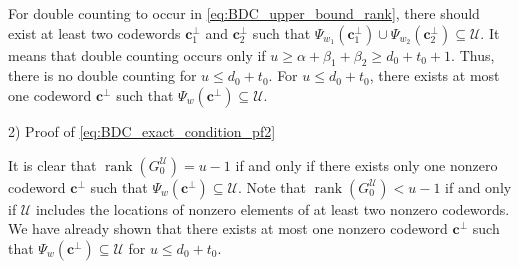 \documentclass[10pt,twocolumn,twoside,submit]{JCNtran}
\DeclareMathOperator{\rank}{rank}
\begin{document}
	For double counting to occur in \eqref{eq:BDC_upper_bound_rank}, there should exist at least two codewords ${\mathbf{c}}_1^{\perp}$ and ${\mathbf{c}}_2^{\perp}$ such that $\Psi_{w_1}\left({\mathbf{c}}_1^{\perp}\right) \cup \Psi_{w_2}\left({\mathbf{c}}_2^{\perp}\right) \subseteq\mathcal{U}$. It means that double counting occurs only if $u \ge \alpha + \beta_1 + \beta_2 \ge d_0 + t_0 + 1$. Thus, there is no double counting for $u \le d_0 + t_0$. For $u \le d_0 + t_0$, there exists at most one codeword ${\mathbf{c}}^{\perp}$ such that $\Psi_{w}\left({\mathbf{c}}^{\perp} \right) \subseteq {\mathcal{U}}$.
	
	2) Proof of \eqref{eq:BDC_exact_condition_pf2}
	
	It is clear that $\rank \left( G_0^{\mathcal{U}}\right) = u - 1$ if and only if there exists only one nonzero codeword $\mathbf{c}^{\perp}$ such that $\Psi_{w}\left( {\mathbf{c}}^{\perp} \right) \subseteq {\mathcal{U}}$. Note that $\rank \left( G_0^{\mathcal{U}}\right) < u - 1$ if and only if $\mathcal{U}$ includes the locations of nonzero elements of at least two nonzero codewords. We have already shown that there exists at most one nonzero codeword ${\mathbf{c}}^{\perp}$ such that $\Psi_{w}\left( {\mathbf{c}}^{\perp} \right) \subseteq {\mathcal{U}}$ for $u \le d_0 + t_0$.
	
\end{document}
